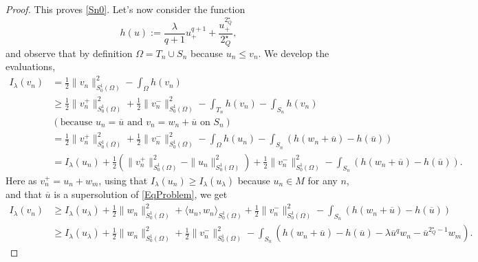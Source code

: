 \documentclass[11pt]{amsart}
\numberwithin{equation}{section} %
\theoremstyle{definition}
\newcommand{\m}{\mbox}
\begin{document}
\begin{proof}
	This proves \eqref{Sn0}. Let's now consider the function
	\[
	h(u):=\frac{\lambda}{q+1}u_+^{q+1}+\frac{u_+^{2^\star_Q}}{2^\star_Q},
	\]
	and observe that by definition $\Omega=T_n\cup S_n$ because $u_n\leq v_n$.
	We develop the evaluations,
	\begin{align*}
		I_\lambda(v_n)&=\frac{1}{2}\|v_n\|_{S_{0}^{1}(\Omega)}^2-\int_\Omega h(v_n)\\
		&\geq \frac{1}{2}\|v_n^+\|_{S_{0}^{1}(\Omega)}^2+\frac{1}{2}\|v_n^-\|_{S_{0}^{1}(\Omega)}^2-\int_{T_n} h(v_n)-\int_{S_n}h(v_n)\\
		&(\m{because }u_n=\overline u\m{ and }v_n=w_n+\overline u\m{ on }S_n)\\
		&=\frac{1}{2}\|v_n^+\|_{S_{0}^{1}(\Omega)}^2+\frac{1}{2}\|v_n^-\|_{S_{0}^{1}(\Omega)}^2-\int_\Omega h(u_n)-\int_{S_n}(h(w_n+\overline u)-h(\overline u))\\
		&=I_\lambda(u_n)+\frac{1}{2}\left(\|v_n^+\|_{S_{0}^{1}(\Omega)}^2-\|u_n\|_{S_{0}^{1}(\Omega)}^2\right)+\frac{1}{2}\|v_n^-\|_{S_{0}^{1}(\Omega)}^2-\int_{S_n}\left(h(w_n+\overline u)-h(\overline u)\right).
	\end{align*}
	Here as $v_n^+=u_n+w_m$, using that $I_\lambda(u_n)\geq I_\lambda (u_\lambda)$
	because $u_n\in M$ for any $n$, and that $\overline u$ is a supersolution of \eqref{EqProblem},
	we get 
	\begin{equation}\label{eqADV}
		\begin{aligned}
		I_\lambda(v_n)&\geq I_\lambda (u_\lambda)+\frac{1}{2}\|w_n\|_{S_{0}^{1}(\Omega)}^2+\langle u_n,w_n\rangle_{S_{0}^{1}(\Omega)}+\frac{1}{2}\|v_n^-\|_{S_{0}^{1}(\Omega)}^2
		-\int_{S_n}\left(h(w_n+\overline u)-h(\overline u)\right)\\
		&\geq I_\lambda(u_\lambda)+\frac{1}{2}\|w_n\|_{S_{0}^{1}(\Omega)}^2+\frac{1}{2}\|v_n^-\|_{S_{0}^{1}(\Omega)}^2
		-\int_{S_n}\left(h(w_n+\overline u)-h(\overline u)-\lambda \overline u^qw_n-\overline u^{2^\star_Q-1}w_m\right).
		\end{aligned}
	\end{equation}
	

\end{proof}
\end{document}
